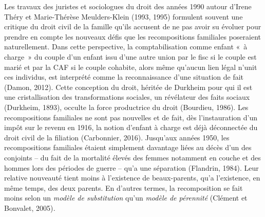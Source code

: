 \documentclass[
  12pt,
]{book}
\begin{document}
Les travaux des juristes et sociologues du droit des années 1990 autour
d'Irene Théry et Marie-Thérèse Meulders-Klein (1993, 1995) formulent
souvent une critique du droit civil de la famille qu'ils accusent de ne
pas avoir su évoluer pour prendre en compte les nouveaux défis que les
recompositions familiales poseraient naturellement. Dans cette
perspective, la comptabilisation comme enfant «~à charge~» du couple
d'un enfant issu d'une autre union par le fisc si le couple est marié et
par la CAF si le couple cohabite, alors même qu'aucun lien légal n'unit
ces individus, est interprété comme la reconnaissance d'une situation de
fait (Damon, 2012). Cette conception du droit, héritée de Durkheim pour
qui il est une cristallisation des transformations sociales, un
révélateur des faits sociaux (Durkheim, 1893), occulte la force
productrice du droit (Bourdieu, 1986). Les recompositions familiales ne
sont pas nouvelles et de fait, dès l'instauration d'un impôt sur le
revenu en 1916, la notion d'enfant à charge est déjà déconnectée du
droit civil de la filiation (Carbonnier, 2016). Jusqu'aux années 1950,
les recompositions familiales étaient simplement davantage liées au
décès d'un des conjoints -- du fait de la mortalité élevés des femmes
notamment en couche et des hommes lors des périodes de guerre -- qu'a
une séparation (Flandrin, 1984). Leur relative nouveauté tient moins à
l'existence de beaux-parents, qu'a l'existence, en même temps, des deux
parents. En d'autres termes, la recomposition se fait moins selon un
\emph{modèle de substitution} qu'un \emph{modèle de pérennité} (Clément
et Bonvalet, 2005)\emph{.}
\end{document}
